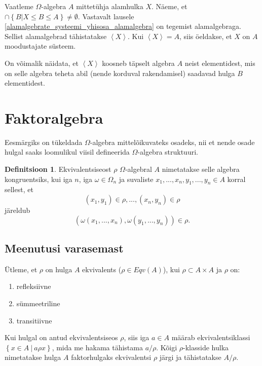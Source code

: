 \documentclass[12pt]{report}
\numberwithin{equation}{section}
\theoremstyle{definition}
\newtheorem{kongruents}[equation]{Definitsioon}
\theoremstyle{plain}
\begin{document}
Vaatleme $\Omega$-algebra $A$ mittet\"uhja alamhulka $X$.
Näeme, et $\cap \left\lbrace B | X \leq B \leq A \right\rbrace \neq \emptyset$. Vastavalt lausele \ref{alamalgebrate_systeemi_yhisosa_alamalgebra} on tegemist alamalgebraga. Sellist alamalgebrad tähistatakse $\left\langle X \right\rangle$.
Kui $\left\langle X \right\rangle = A$, siis öeldakse, et  $X$ on $A$ moodustajate s\"usteem.

On võimalik näidata, et $\left\langle X \right\rangle$ koosneb täpselt algebra $A$ neist elementidest, mis on selle algebra teheta abil (nende korduval rakendamisel) saadavad hulga $B$ elementidest.



\section{Faktoralgebra}

Eesmärgiks on t\"ukeldada $\Omega$-algebra mittelõikuvateks osadeks, nii et nende osade hulgal saaks loomulikul viisil defineerida $\Omega$-algebra struktuuri. 

\begin{kongruents}
Ekvivalentsiseost $\rho$ $\Omega$-algebral $A$ nimetatakse selle algebra kongruentsiks, kui iga $n$, iga $\omega \in \Omega_n$ ja suvaliste $x_1,...,x_n ,y_1,...,y_n \in A$ korral sellest, et
\begin{equation*}
(x_1,y_1) \in \rho,...,(x_n,y_n) \in \rho
\end{equation*}
järeldub
\begin{equation*}
(\omega(x_1,...,x_n),\omega(y_1,...,y_n)) \in \rho.
\end{equation*}
\end{kongruents}

\colorbox{background_example}{\parbox{\textwidth}{
\subsection*{Meenutusi varasemast}
\"Utleme, et $\rho$ on hulga $A$ ekvivalents ($\rho \in Eqv(A)$), kui $\rho \subset A \times A $ ja $\rho$ on:
\begin{enumerate}
\item refleksiivne
\item s\"ummeetriline
\item transitiivne
\end{enumerate}
}}

Kui hulgal on antud ekvivalentsiseos $\rho$, siis iga $a \in A$ määrab ekvivalentsiklassi  $\left\lbrace x \in A ~|~ a \rho x \right\rbrace$, mida me hakama tähistama  $a / \rho$. Kõigi  $\rho$-klasside hulka nimetatakse hulga $A$ faktorhulgaks ekvivalentsi $\rho$ järgi ja tähistatakse $A/ \rho$. 
\end{document}
